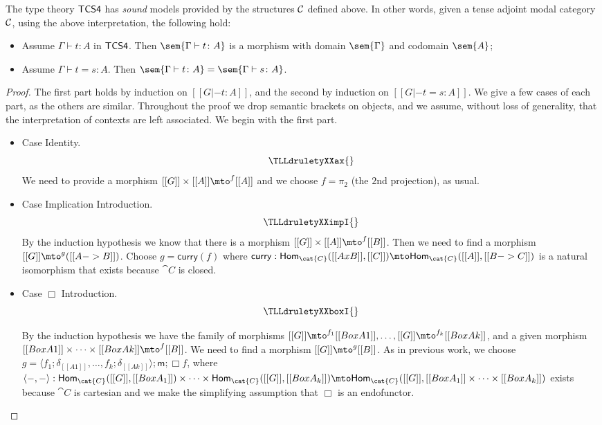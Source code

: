 \begin{theorem*}
The type theory $\sf{TCS4}$ has \textit{sound} models provided by the
structures $\cal C$ defined above.  In other words, given a tense
adjoint modal category $\cal C$, using the above interpretation, the
following hold:
\begin{itemize}
\item Assume $\Gamma \vdash t : A$ in $\sf{TCS4}$. Then $\sem{\Gamma
  \vdash t \colon A}$ is a morphism with domain $\sem{\Gamma}$ and
  codomain $\sem{A}$;
\item Assume $\Gamma \vdash t = s \colon A$. Then $\sem{\Gamma
  \vdash t \colon A} = \sem{\Gamma \vdash s \colon A}$.
\end{itemize}
\end{theorem*}
\begin{proof}
  The first part holds by induction on $[[G |- t : A]]$, and the
  second by induction on $[[G |- t = s : A]]$.  We give a few cases of each part, as the others are similar.  Throughout the proof we
  drop semantic brackets on objects, and we assume, without loss of
  generality, that the interpretation of contexts are left associated.
  We begin with the first part.

  \begin{itemize}
  \item[] Case Identity.\\
    \[
    \TLLdruletyXXax{}
    \]
    We need to provide a morphism $[[G]] \times [[A]] \mto^{f}
    [[A]]$ and we choose $f = \pi_2$ (the $2$nd projection), as usual.

    \item[] Case Implication Introduction.\\
    \[
    \TLLdruletyXXimpI{}
    \]
    By the induction hypothesis we know that there is a morphism
    $[[G]] \times [[A]] \mto^f [[B]]$.  Then we need  to find a
    morphism $[[G]] \mto^{g} ([[A -> B]])$.  Choose $g =
    \mathsf{curry}(f)$ where $\mathsf{curry} :
    \mathsf{Hom}_{\cat{C}}([[A x B]],[[C]]) \mto
    \mathsf{Hom}_{\cat{C}}([[A]],[[B -> C]])$ is a natural isomorphism
    that exists because $\cat{C}$ is closed.

  \item[] Case $\Box$ Introduction.\\
    \[
    \TLLdruletyXXboxI{}
    \]

    By the induction hypothesis we have the family of morphisms $[[G]]
    \mto^{f_1} [[Box A1]], \ldots, [[G]] \mto^{f_k} [[Box Ak]]$, and a given morphism
    $[[Box A1]] \times \cdots \times [[Box Ak]] \mto^f [[B]]$.  We need 
     to find a morphism $[[G]] \mto^{g} [[B]]$.  As in previous work, we choose $g =
    \langle f_1;\delta_{[[A1]]},\ldots,f_k;\delta_{[[Ak]]} \rangle;\mathsf{m};\Box f$, where $\langle -,-\rangle :
    \mathsf{Hom}_{\cat{C}}([[G]],[[Box A_1]]) \times \cdots \times
    \mathsf{Hom}_{\cat{C}}([[G]],[[Box A_k]]) \mto \mathsf{Hom}_{\cat{C}}([[G]],[[Box A_1]]
    \times \cdots \times [[Box A_k]])$ exists because $\cat{C}$ is cartesian and we make the simplifying assumption that $\Box$ is an endofunctor.


\end{itemize}
\end{proof}
